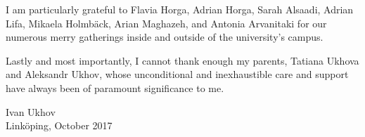 I am particularly grateful to Flavia Horga, Adrian Horga, Sarah Alsaadi, Adrian
Lifa, Mikaela Holmbäck, Arian Maghazeh, and Antonia Arvanitaki for our numerous
merry gatherings inside and outside of the university's campus.

Lastly and most importantly, I cannot thank enough my parents, Tatiana Ukhova
and Aleksandr Ukhov, whose unconditional and inexhaustible care and support have
always been of paramount significance to me.

\vspace{4em}
\hfill
\noindent
\begin{minipage}{0.35\textwidth}
  Ivan Ukhov\\
  Linköping, October 2017
\end{minipage}
